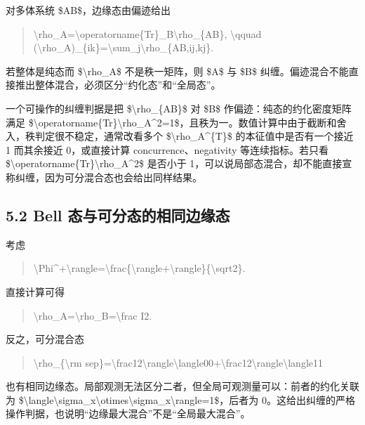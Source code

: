 \documentclass[UTF8,openany,11pt,fontset=fandol]{ctexbook}
\begin{document}
对多体系统 \$AB\$，边缘态由偏迹给出

\begin{quote}
\textbackslash rho\_A=\textbackslash operatorname\{Tr\}\_B\textbackslash rho\_\{AB\},
\textbackslash qquad
(\textbackslash rho\_A)\_\{ik\}=\textbackslash sum\_j\textbackslash rho\_\{AB,ij,kj\}.
\end{quote}

若整体是纯态而 \$\textbackslash rho\_A\$ 不是秩一矩阵，则 \$A\$ 与 \$B\$
纠缠。偏迹混合不能直接推出整体混合，必须区分``约化态''和``全局态''。

一个可操作的纠缠判据是把 \$\textbackslash rho\_\{AB\}\$ 对 \$B\$
作偏迹：纯态的约化密度矩阵满足
\$\textbackslash operatorname\{Tr\}\textbackslash rho\_A\^{}2=1\$，且秩为一。数值计算中由于截断和舍入，秩判定很不稳定，通常改看多个
\$\textbackslash rho\_A\^{}\{T\}\$ 的本征值中是否有一个接近 1 而其余接近
0，或直接计算 concurrence、negativity 等连续指标。若只看
\$\textbackslash operatorname\{Tr\}\textbackslash rho\_A\^{}2\$ 是否小于
1，可以说局部态混合，却不能直接宣称纠缠，因为可分混合态也会给出同样结果。

\subsection{\texorpdfstring{\textbf{5.2 Bell
态与可分态的相同边缘态}}{5.2 Bell 态与可分态的相同边缘态}}\label{bell-ux6001ux4e0eux53efux5206ux6001ux7684ux76f8ux540cux8fb9ux7f18ux6001}

考虑

\begin{quote}
\textbar\textbackslash Phi\^{}+\textbackslash rangle=\textbackslash frac\{\textbackslash rangle+\textbackslash rangle\}\{\textbackslash sqrt2\}.
\end{quote}

直接计算可得

\begin{quote}
\textbackslash rho\_A=\textbackslash rho\_B=\textbackslash frac I2.
\end{quote}

反之，可分混合态

\begin{quote}
\textbackslash rho\_\{\textbackslash rm
sep\}=\textbackslash frac12\textbackslash rangle\textbackslash langle00\textbar+\textbackslash frac12\textbackslash rangle\textbackslash langle11\textbar{}
\end{quote}

也有相同边缘态。局部观测无法区分二者，但全局可观测量可以：前者的约化关联为
\$\textbackslash langle\textbackslash sigma\_x\textbackslash otimes\textbackslash sigma\_x\textbackslash rangle=1\$，后者为
0。这给出纠缠的严格操作判据，也说明``边缘最大混合''不是``全局最大混合''。
\end{document}
